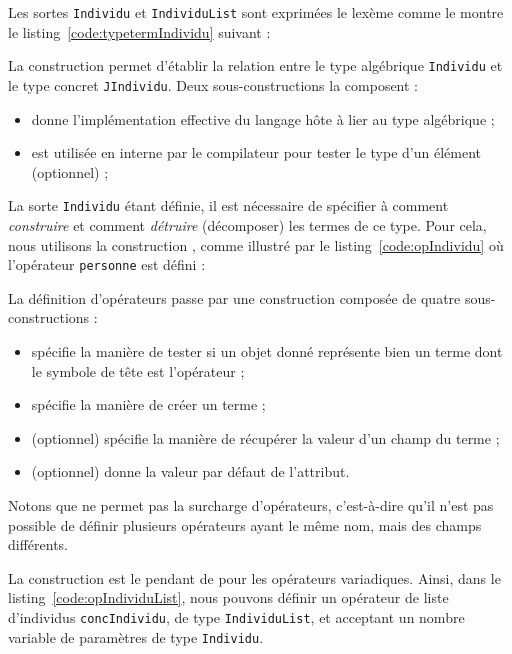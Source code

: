 Les sortes \texttt{Individu} et \texttt{IndividuList} sont exprimées {\via} le lexème
 comme le montre le listing~\ref{code:typetermIndividu} suivant :
%


La construction  permet d'établir la relation entre le type
algébrique \texttt{Individu} et le type concret {\java} \texttt{JIndividu}.
Deux sous-constructions la composent :
\begin{itemize}
  \item {} donne l'implémentation effective du langage hôte
    à lier au type algébrique ; 
  \item {} est utilisée en interne par le compilateur pour tester le
    type d'un élément (optionnel) ;
\end{itemize}

La sorte \texttt{Individu} étant définie, il est nécessaire de spécifier à
{\tom} comment \emph{construire} et comment \emph{détruire} (décomposer) les
termes de ce type. Pour cela, nous utilisons la construction , comme
illustré par le listing~\ref{code:opIndividu} où l'opérateur \texttt{personne}
est défini :

%


La définition d'opérateurs passe par une construction composée de quatre
sous-cons\-tructions :
\begin{itemize}
  \item {} spécifie la manière de tester si un objet donné
    représente bien un terme dont le symbole de tête est l'opérateur ;
  \item {} spécifie la manière de créer un terme ;
  \item {} (optionnel) spécifie la manière de récupérer la valeur
    d'un champ du terme ;
  \item {} (optionnel) donne la valeur par défaut de l'attribut.
\end{itemize}
Notons que {\tom} ne permet pas la surcharge d'opérateurs, c'est-à-dire
qu'il n'est pas possible de définir plusieurs opérateurs ayant le même nom, mais
des champs différents.

La construction  est le pendant de  pour les opérateurs
variadiques. Ainsi, dans le listing~\ref{code:opIndividuList}, nous pouvons
définir un opérateur de liste d'individus \texttt{concIndividu}, de type
\texttt{IndividuList}, et acceptant un nombre variable de paramètres de type
\texttt{Individu}.
%
\clearpage %


